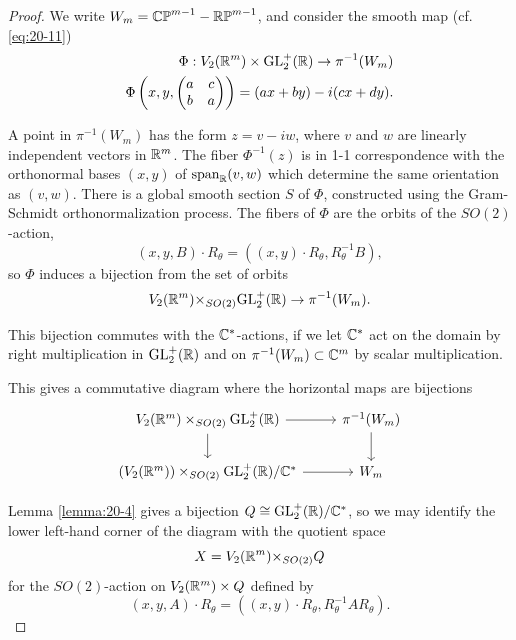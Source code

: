 \begin{proof}
  We write ${W}_{m} = {\mathbb{CP}}^{m- 1}- \mathbb{RP}^{m- 1}$, and consider the smooth map (cf. \eqref{eq:20-11})
  \begin{align*}
    \Phi  : {V}_{2}( {{\mathbb{R}}^m})  \times  {\ensuremath{\mathrm{GL}}_2^+}( \mathbb{R})  \rightarrow  {\pi }^{-1}( {W}_{m})\\
    \Phi \left(x, y, \begin{pmatrix} a & c \\  b & a \end{pmatrix}\right) = ( {{ax} + {by}}) - i( {{cx} + {dy}}).
  \end{align*}
  
  A point in ${\pi }^{-1}( {W}_{m})$ has the form $z = v- {iw}$, where $v$ and $w$ are linearly independent 
  vectors in ${{\mathbb{R}}^m}$. The fiber ${\Phi }^{-1}( z)$ is in 1-1 correspondence with the orthonormal 
  bases $(x, y)$ of ${\mathrm{span}}_{{\mathbb{R}}}( {v,w})$ which determine the same orientation as $(v, w)$. There is a 
  global smooth section $S$ of $\Phi$, constructed using the Gram-Schmidt orthonormalization process. 
  The fibers of $\Phi$ are the orbits of the ${SO}( 2)$-action,
  \[
    (x, y, B)  \cdot  {R}_{\theta} = ( {( {x,y})  \cdot  {R}_{\theta },{R}_{\theta }^{-1}B}),
  \]
  so $\Phi$ induces a bijection from the set of orbits
  \[
    {V}_{2}( {{\mathbb{R}}^m}) { \times  }_{{SO}( 2) }{\mathrm{GL}_2^+}( \mathbb{R})  \rightarrow  {\pi }^{-1}( {W}_{m}).
  \]
  
  This bijection commutes with the ${\mathbb{C}}^*$-actions, if we let ${\mathbb{C}}^*$ act on the domain 
  by right multiplication in ${\mathrm{GL}_2^+}( \mathbb{R})$ and on ${\pi }^{-1}( {W}_{m})  \subset  {\ensuremath{\mathbb{C}}}^{m}$ 
  by scalar multiplication. 
  
  This gives a commutative diagram where the horizontal maps are bijections
  \[\begin{tikzcd}
    V_2(\RR^m)\times_{SO(2)}\R{GL}_2^+(\RR)\dar{}\rar{} & \pi^{-1}(W_m)\dar{}\\
    (V_2(\RR^m))\times_{SO(2)}\R{GL}_2^+(\RR)/\CC^*\rar{} & W_m
  \end{tikzcd}\]

  Lemma \ref{lemma:20-4} gives a bijection $Q \cong  {\ensuremath{\mathrm{GL}}_2^+}( \mathbb{R}) /{\mathbb{C}}^*$, so we may identify 
  the lower left-hand corner of the diagram with the quotient space
  \[
    X = {V}_{2}( {{\mathbb{R}}^m}) { \times  }_{{SO}( 2) }Q
  \]  
  for the ${SO}( 2)$-action on ${V}_{2}( {{\mathbb{R}}^m})  \times  Q$ defined by
  \[
    ( {x,y,A})\cdot{R}_{\theta } = ( {( {x,y})\cdot{R}_{\theta },{R}_{\theta }^{-1}A{R}_{\theta }}).
  \]
  

\end{proof}
